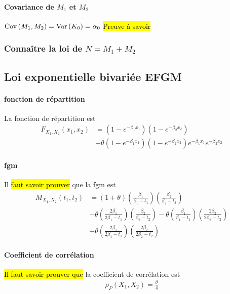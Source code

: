 \documentclass[10pt, french]{article}
\begin{document}
\begin{multicols*}{2}
\paragraph{Covariance de $M_1$ et $M_2$} $\mathrm{Cov} \left( M_1, M_2 \right) = \mathrm{Var} \left( K_0 \right) = \alpha_0$
\hl{Preuve à savoir}

\subsubsection{Connaître la loi de $N = M_1 + M_2$}




\subsection{Loi exponentielle bivariée EFGM}
\paragraph{fonction de répartition}
La fonction de répartition est
\begin{align*}
F_{X_1, X_2}(x_1, x_2)	& = (1 - e^{-\beta_1 x_1})(1- e^{-\beta_2 x_2}) \\
& + \theta (1 - e^{-\beta_1 x_1})(1 - e^{-\beta_2 x_2}) e^{-\beta_1 x_1} e^{-\beta_2 x_2}
\end{align*}

\paragraph{fgm}
Il \hl{faut savoir prouver} que la fgm est
\begin{align*}
M_{X_1, X_2}(t_1, t_2) & = (1 +\theta) \left ( \frac{\beta_1}{\beta_1 - t_1} \right  )  \left ( \frac{\beta_2}{\beta_2 - t_2} \right  ) \\
& - \theta \left ( \frac{2 \beta_1}{2 \beta_1 - t_1} \right  )  \left ( \frac{\beta_2}{\beta_2 - t_2} \right  ) - \theta \left ( \frac{\beta_1}{\beta_1 - t_1} \right  )  \left ( \frac{2 \beta_2}{2 \beta_2 - t_2} \right  ) \\
& + \theta \left ( \frac{2 \beta_1}{2 \beta_1 - t_1} \right  )  \left ( \frac{2 \beta_2}{2 \beta_2 - t_2} \right  )
\end{align*}

\paragraph{Coefficient de corrélation}
\hl{Il faut savoir prouver que} la coefficient de corrélation est
\begin{align*}
\rho_P(X_1, X_2) = \frac{\theta}{4}
\end{align*}


\end{multicols*}
\end{document}
